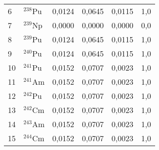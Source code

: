 \begin{table}[H]
\begin{tabular}{llcccc}
6            & $^{238}$Pu          & 0,0124                                     & 0,0645                        & 0,0115                        & 1,0                           \\
7            & $^{239}$Np          & 0,0000                                     & 0,0000                        & 0,0000                        & 0,0                           \\
8            & $^{239}$Pu          & 0,0124                                     & 0,0645                        & 0,0115                        & 1,0                           \\
9            & $^{240}$Pu          & 0,0124                                     & 0,0645                        & 0,0115                        & 1,0                           \\
10           & $^{241}$Pu          & 0,0152                                     & 0,0707                        & 0,0023                        & 1,0                           \\
11           & $^{241}$Am          & 0,0152                                     & 0,0707                        & 0,0023                        & 1,0                           \\
12           & $^{242}$Pu          & 0,0152                                     & 0,0707                        & 0,0023                        & 1,0                           \\
13           & $^{242}$Cm          & 0,0152                                     & 0,0707                        & 0,0023                        & 1,0                           \\
14           & $^{243}$Am          & 0,0152                                     & 0,0707                        & 0,0023                        & 1,0                           \\
15           & $^{244}$Cm          & 0,0152                                     & 0,0707                        & 0,0023                        & 1,0                           \\ \hline
\end{tabular}
\end{table}



